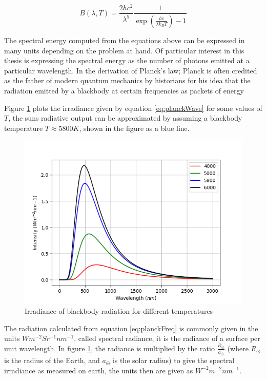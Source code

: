 \begin{equation}\label{eq:planckWave}
    B(\lambda, T) = \frac{2 h c^2}{\lambda^5} \frac{1}{\exp(\frac{hc}{\lambda k_B T}) - 1}
\end{equation}

The spectral energy computed from the equations above can be expressed in many units depending on the problem at hand. Of particular interest in this thesis is expressing the spectral energy as the number of photons emitted at a particular wavelength. In the derivation of Planck's law; Planck is often credited as the father of modern quantum mechanics by historians for his idea that the radiation emitted by a blackbody at certain frequencies as packets of energy 

Figure \ref{fig:blackbody} plots the irradiance given by equation \eqref{eq:planckWave} for some values of $T$, the suns radiative output can be approximated by assuming a blackbody temperature $T \approx 5800 K$, shown in the figure as a blue line.

\begin{figure}[h!]
    \centering
    \includegraphics[scale=0.6]{figures/ReferenceFigures/blackbody.png}
    \caption{Irradiance of blackbody radiation for different temperatures}
    \label{fig:blackbody}
\end{figure}


The radiation calculated from equation \eqref{eq:planckFreq} is commonly given in the units $W m^{-2} Sr^{-1} nm^{-1}$, called spectral radiance, it is the radiance of a surface per unit wavelength. In figure \ref{fig:blackbody}, the radiance is multiplied by the ratio $\frac{R_{\odot}}{a_{\oplus}}$ (where $R_{\odot}$ is the radius of the Earth, and $a_{\oplus}$ is the solar radius) to give the spectral irradiance as measured on earth, the units then are given as  $W ^{-2} m^{-2} nm^{-1}$.
\\

